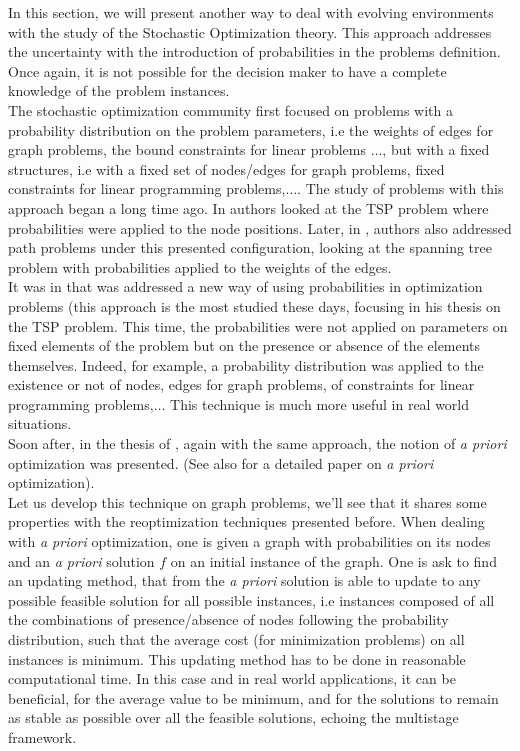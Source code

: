 \documentclass[a4paper]{book}
\begin{document}
In this section, we will present another way to deal with evolving environments with the study of the Stochastic Optimization theory. This approach addresses the uncertainty with the introduction of probabilities in the problems definition. Once again, it is not possible for the decision maker to have a complete knowledge of the problem instances.\\
The stochastic optimization community first focused on problems with a probability distribution on the problem parameters, i.e the weights of edges for graph problems, the bound constraints for linear problems $\ldots$, but with a fixed structures, i.e with a fixed set of nodes/edges for graph problems, fixed constraints for linear programming problems,$\ldots$. The study of problems with this approach began a long time ago. In \cite{beardwood1959shortest} authors looked at the {\sc TSP} problem where probabilities were applied to the node positions. Later, in \cite{Frieze85}, authors also addressed path problems under this presented configuration, looking at the {\sc spanning tree} problem with probabilities applied to the weights of the edges. \\
It was in \cite{jaillet1985probabilistic} that was addressed a new way of using probabilities in optimization problems (this approach is the most studied these days, focusing in his thesis on the {\sc TSP} problem. This time, the probabilities were not applied on parameters on fixed elements of the problem but on the presence or absence of the elements themselves. Indeed, for example, a probability distribution was applied to the existence or not of nodes, edges for graph problems, of constraints for linear programming problems,$\ldots$ This technique is much more useful in real world situations.\\
Soon after, in the thesis of \cite{bertsimas1988probabilistic}, again with the same approach, the notion of \textit{a priori} optimization was presented. (See also \cite{BertsimasJO90} for a detailed paper on \textit{a priori} optimization). 
\\Let us develop this technique on graph problems, we'll see that it shares some properties with the reoptimization techniques presented before. When dealing with \textit{a priori} optimization, one is given a graph with probabilities on its nodes and an \textit{a priori} solution $f$ on an initial instance of the graph. 
One is ask to find an updating method, that from the \textit{a priori} solution is able to update to any possible feasible solution for all possible instances, i.e instances composed of all the combinations of presence/absence of nodes following the probability distribution, such that the average cost (for minimization problems) on all instances is minimum. This updating method has to be done in reasonable computational time. In this case and in real world applications, it can be beneficial, for the average value to be minimum, and for the solutions to remain as stable as possible over all the feasible solutions, echoing the multistage framework. 
\end{document}
